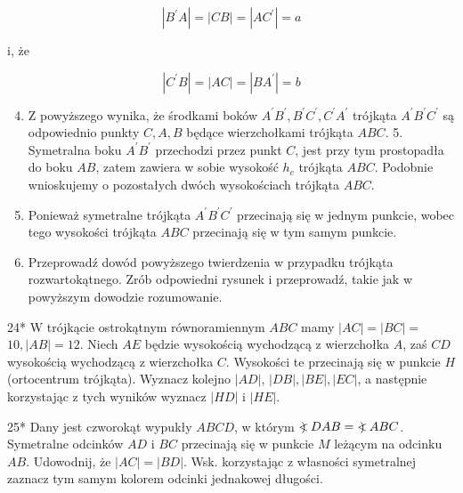 \documentclass[10pt]{article}
\newcommand\Varangle{\mathop{{<\!\!\!\!\!\text{\small)}}\:}\nolimits}
\begin{document}
\[
\left|B^{\prime} A\right|=|C B|=\left|A C^{\prime}\right|=a
\]

i, że

\[
\left|C^{\prime} B\right|=|A C|=\left|B A^{\prime}\right|=b
\]

\begin{enumerate}
  \setcounter{enumi}{3}
  \item Z powyższego wynika, że środkami boków \(A^{\prime} B^{\prime}, B^{\prime} C^{\prime}, C^{\prime} A^{\prime}\) trójkąta \(A^{\prime} B^{\prime} C^{\prime}\) są odpowiednio punkty \(C, A, B\) będące wierzchołkami trójkąta \(A B C\). 5. Symetralna boku \(A^{\prime} B^{\prime}\) przechodzi przez punkt \(C\), jest przy tym prostopadła do boku \(A B\), zatem zawiera w sobie wysokość \(h_{c}\) trójkąta \(A B C\). Podobnie wnioskujemy o pozostałych dwóch wysokościach trójkąta \(A B C\).
  \item Ponieważ symetralne trójkąta \(A^{\prime} B^{\prime} C^{\prime}\) przecinają się w jednym punkcie, wobec tego wysokości trójkąta \(A B C\) przecinają się w tym samym punkcie.
  \item Przeprowadź dowód powyższego twierdzenia w przypadku trójkąta rozwartokątnego. Zrób odpowiedni rysunek i przeprowadź, takie jak w powyższym dowodzie rozumowanie.
\end{enumerate}

24* W trójkącie ostrokątnym równoramiennym \(A B C\) mamy \(|A C|=|B C|=\) \(10,|A B|=12\). Niech \(A E\) będzie wysokością wychodzącą z wierzchołka \(A\), zaś \(C D\) wysokością wychodzącą z wierzchołka \(C\). Wysokości te przecinają się w punkcie \(H\) (ortocentrum trójkąta). Wyznacz kolejno \(|A D|\), \(|D B|,|B E|,|E C|\), a następnie korzystając z tych wyników wyznacz \(|H D|\) i \(|H E|\).

25* Dany jest czworokąt wypukły \(A B C D\), w którym \(\Varangle D A B=\Varangle A B C\). Symetralne odcinków \(A D\) i \(B C\) przecinają się w punkcie \(M\) leżącym na odcinku \(A B\). Udowodnij, że \(|A C|=|B D|\). Wsk. korzystając z własności symetralnej zaznacz tym samym kolorem odcinki jednakowej długości.
\end{document}
